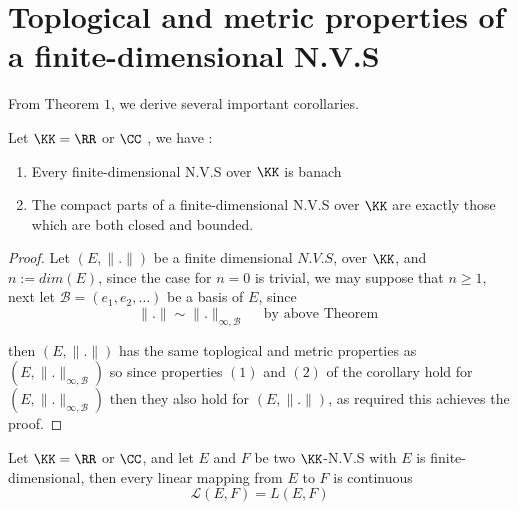 \section{Toplogical and metric properties of a finite-dimensional N.V.S}
From Theorem $1$, we derive several important corollaries. 
\begin{theorem}[]
Let $\KK = \RR $ or $\CC $ , we have : 
\begin{enumerate}[(1)]
	\item Every finite-dimensional N.V.S over $\KK$ is banach
	\item The compact parts of a finite-dimensional 
		N.V.S over $\KK$ are exactly those which are 
		both closed and bounded.
\end{enumerate}
\end{theorem}
\begin{proof}
Let $\left( E,\| . \|  \right)$  be a finite dimensional $N.V.S$, over $\KK$, 
and $n := dim \left( E \right)$, since the case for $n=0$ is trivial, we may
suppose that $n \geq 1$, next let $\mathcal{B} = \left( e_1, e_2, \hdots  \right)$ 
be a basis of $E$, since 
\[
\| . \| \sim \| . \| _{\infty ,\mathcal{B} } \quad 
\text{ by above Theorem } 
\]

then $\left( E, \| . \|  \right)$ has the same
toplogical and metric properties as $\left( E, \| . \| _{\infty ,\mathcal{B} } 
\right)$ so since properties $(1)$ and $(2)$ of the corollary
hold for $\left( E, \| . \| _{\infty ,\mathcal{B} } \right)$  
then they also hold for $\left( E,\| . \|  \right)$, as required this 
achieves the proof.
\end{proof}
\begin{theorem}[]
Let $\KK = \RR $  or $\CC $, and let $E$ and $F$ 
be two $\KK$-N.V.S with $E$ is finite-dimensional, then every
linear mapping from $E$ to $F$ is continuous 
\[
\mathcal{L}  \left( E,F \right) = 
L \left( E,F \right)
\]
\end{theorem}
